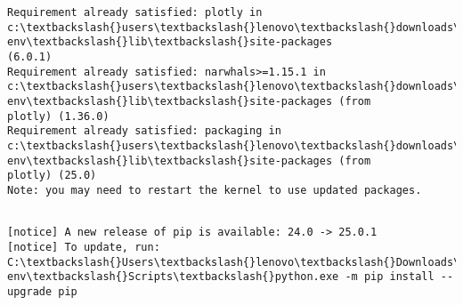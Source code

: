 \documentclass[11pt]{article}
\begin{document}
    \begin{Verbatim}[commandchars=\\\{\}]
Requirement already satisfied: plotly in
c:\textbackslash{}users\textbackslash{}lenovo\textbackslash{}downloads\textbackslash{}snscrape\_project\textbackslash{}snscrape-env\textbackslash{}lib\textbackslash{}site-packages
(6.0.1)
Requirement already satisfied: narwhals>=1.15.1 in
c:\textbackslash{}users\textbackslash{}lenovo\textbackslash{}downloads\textbackslash{}snscrape\_project\textbackslash{}snscrape-env\textbackslash{}lib\textbackslash{}site-packages (from
plotly) (1.36.0)
Requirement already satisfied: packaging in
c:\textbackslash{}users\textbackslash{}lenovo\textbackslash{}downloads\textbackslash{}snscrape\_project\textbackslash{}snscrape-env\textbackslash{}lib\textbackslash{}site-packages (from
plotly) (25.0)
Note: you may need to restart the kernel to use updated packages.
    \end{Verbatim}

    \begin{Verbatim}[commandchars=\\\{\}]

[notice] A new release of pip is available: 24.0 -> 25.0.1
[notice] To update, run: C:\textbackslash{}Users\textbackslash{}lenovo\textbackslash{}Downloads\textbackslash{}snscrape\_project\textbackslash{}snscrape-
env\textbackslash{}Scripts\textbackslash{}python.exe -m pip install --upgrade pip
    \end{Verbatim}
\end{document}
